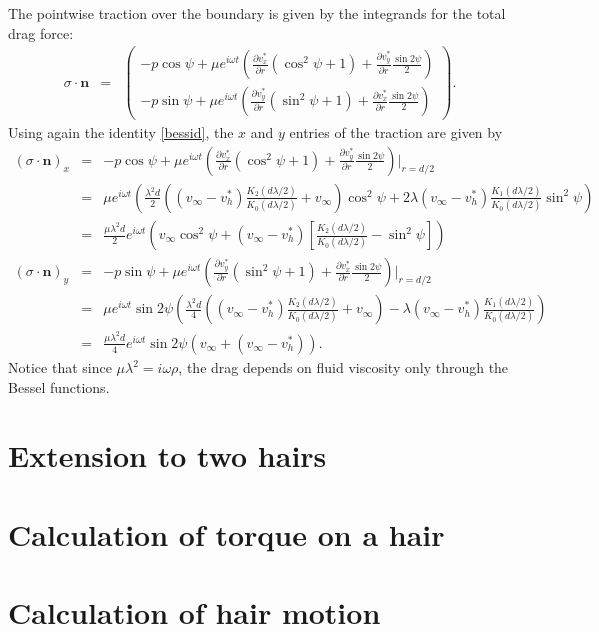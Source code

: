 \documentclass[11pt]{amsart}
\newcommand{\vinf}{v_{\infty}}
\newcommand{\om}{\omega}
\newcommand{\bn}{\mathbf{n}}
\newcommand{\baas}[1]{\begin{eqnarray*} #1 \end{eqnarray*}}
\newcommand{\pd}[2]{\ensuremath{\frac{\partial #1}{\partial #2}}}
\begin{document}
	The pointwise traction over the boundary is given by the integrands for the total drag force:
	\baas{
	\sigma\cdot\bn &=& \begin{pmatrix} -p\cos\psi + \mu e^{i \om t} \left(\pd{v_x^*}{r} (\cos^2\psi+1) + \pd{v_y^*}{r}\frac{\sin 2\psi}{2}\right) \\ -p\sin\psi + \mu e^{i \om t} \left(\pd{v_y^*}{r}(\sin^2\psi+1) + \pd{v_x^*}{r} \frac{\sin 2\psi}{2} \right)\end{pmatrix}.
	}
	Using again the identity \eqref{bessid}, the $x$ and $y$ entries of the traction are given by
	\baas{
	(\sigma\cdot\bn)_x &=& -p\cos\psi + \mu e^{i \om t} \left(\pd{v_x^*}{r} (\cos^2\psi+1) + \pd{v_y^*}{r}\frac{\sin 2\psi}{2}\right)\Bigg|_{r=d/2} \\
	&=& \mu e^{i\om t} \left( \frac{\lambda^2 d}{2}\left((\vinf-v_h^*)\frac{K_2(d\lambda/2)}{K_0(d\lambda/2)} + \vinf \right)\cos^2\psi + 2\lambda (\vinf-v_h^*)\frac{K_1(d\lambda/2)}{K_0(d\lambda/2)}\sin^2\psi\right)\\
	&=& \frac{\mu \lambda^2 d}{2}e^{i\om t} \left(  \vinf\cos^2\psi + (\vinf-v_h^*)\left[ \frac{K_2(d\lambda/2)}{K_0(d\lambda/2)} - \sin^2\psi \right]\right)\\
	(\sigma\cdot\bn)_y &=&-p\sin\psi + \mu e^{i \om t} \left(\pd{v_y^*}{r}(\sin^2\psi+1) + \pd{v_x^*}{r} \frac{\sin 2\psi}{2} \right)\Bigg|_{r=d/2} \\
	&=& \mu e^{i\om t}\sin2\psi \left( \frac{\lambda^2 d}{4}\left((\vinf-v_h^*)\frac{K_2(d\lambda/2)}{K_0(d\lambda/2)} + \vinf \right) -\lambda (\vinf-v_h^*)\frac{K_1(d\lambda/2)}{K_0(d\lambda/2)}\right) \\
	&=& \frac{\mu \lambda^2 d}{4}e^{i\om t}\sin2\psi \left( \vinf + (\vinf-v_h^*) \right).
	}
	Notice that since $\mu \lambda^2 = i\omega\rho$, the drag depends on fluid viscosity only through the Bessel functions.
	
	
	\section{Extension to two hairs}
	
	\section{Calculation of torque on a hair}
	
	\section{Calculation of hair motion}
	
\end{document}
